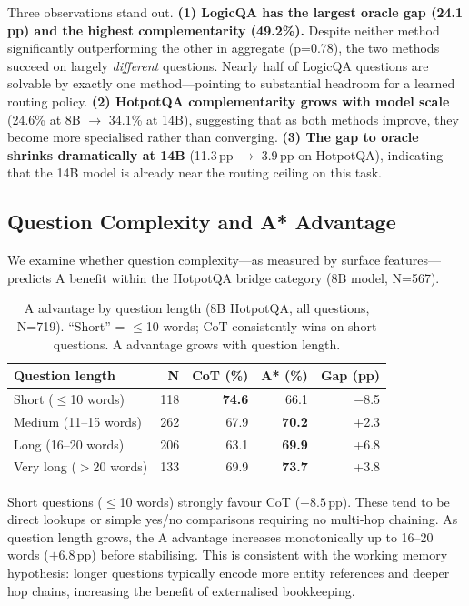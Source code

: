 \documentclass{article}
\begin{document}
Three observations stand out. \textbf{(1) LogicQA has the largest oracle gap (24.1\,pp) and the highest complementarity (49.2\%).} Despite neither method significantly outperforming the other in aggregate (p=0.78), the two methods succeed on largely \emph{different} questions. Nearly half of LogicQA questions are solvable by exactly one method---pointing to substantial headroom for a learned routing policy. \textbf{(2) HotpotQA complementarity grows with model scale} (24.6\% at 8B $\to$ 34.1\% at 14B), suggesting that as both methods improve, they become more specialised rather than converging. \textbf{(3) The gap to oracle shrinks dramatically at 14B} (11.3\,pp $\to$ 3.9\,pp on HotpotQA), indicating that the 14B model is already near the routing ceiling on this task.

\subsection{Question Complexity and A* Advantage}
\label{sec:complexity}

We examine whether question complexity---as measured by surface features---predicts A\* benefit within the HotpotQA bridge category (8B model, N=567).

\begin{table}[h]
\centering
\caption{A\* advantage by question length (8B HotpotQA, all questions, N=719). ``Short'' = $\leq$10 words; CoT consistently wins on short questions. A\* advantage grows with question length.}
\label{tab:qlen}
\small
\begin{tabular}{lrrrr}
\toprule
Question length & N & CoT (\%) & A* (\%) & Gap (pp) \\
\midrule
Short ($\leq$10 words)   & 118 & \textbf{74.6} & 66.1 & $-$8.5 \\
Medium (11--15 words) & 262 & 67.9 & \textbf{70.2} & +2.3 \\
Long (16--20 words)   & 206 & 63.1 & \textbf{69.9} & +6.8 \\
Very long ($>$20 words)  & 133 & 69.9 & \textbf{73.7} & +3.8 \\
\bottomrule
\end{tabular}
\end{table}

Short questions ($\leq$10 words) strongly favour CoT ($-8.5$\,pp). These tend to be direct lookups or simple yes/no comparisons requiring no multi-hop chaining. As question length grows, the A\* advantage increases monotonically up to 16--20 words ($+6.8$\,pp) before stabilising. This is consistent with the working memory hypothesis: longer questions typically encode more entity references and deeper hop chains, increasing the benefit of externalised bookkeeping.
\end{document}
